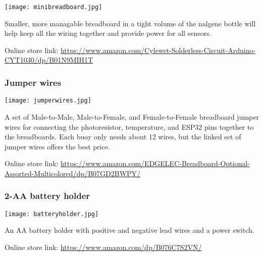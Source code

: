 \hspace{2em}
\texttt{[image: minibreadboard.jpg]}

\begin{flushleft}
    Smaller, more managable breadboard in a tight volume of the nalgene bottle 
    will help keep all the wiring together and provide power for all sensors.
    \newline

    Online store link: \newline
    \footnotesize\url{https://www.amazon.com/Cylewet-Solderless-Circuit-Arduino-CYT1030/dp/B01N9MIH1T}

\end{flushleft}

\hypertarget{jumperwires}{}
\subsubsection{Jumper wires}

\hspace{2em}
\texttt{[image: jumperwires.jpg]}

\begin{flushleft}
    A set of Male-to-Male, Male-to-Female, and Female-to-Female breadboard 
    jumper wires for connecting the photoresistor, temperature, and ESP32 pins 
    together to the breadboards. Each buoy only needs about 12 wires, but the 
    linked set of jumper wires offers the best price.
    \newline

    Online store link: \newline
    \footnotesize\url{https://www.amazon.com/EDGELEC-Breadboard-Optional-Assorted-Multicolored/dp/B07GD2BWPY/}

\end{flushleft}

\hypertarget{batteryholder}{}
\subsubsection{2-AA battery holder}

\hspace{2em}
\texttt{[image: batteryholder.jpg]}

\begin{flushleft}
    An AA battery holder with positive and negative lead wires and a 
    power switch.
    \newline

    Online store link: \newline
    \footnotesize\url{https://www.amazon.com/dp/B076C7S2VN/}

\end{flushleft}

